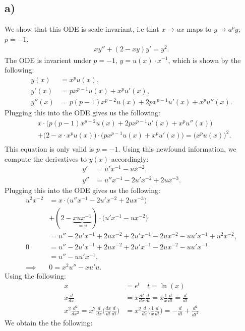 \documentclass[]{article}
\begin{document}
\subsection*{a)}
We show that this ODE is scale invariant, i.e that $x\to ax$ maps to $y\to a^{p}y$; $p = -1$.
\begin{align*}
    xy'' + (2-xy)y' = y^2.
\end{align*}
The ODE is invarient under $p =-1$, $y = u(x)\cdot x^{-1}$, which is shown by the following:
\begin{align*}
    y(x) &= x^p u(x),\\
    y'(x) &= px^{p-1}u(x) + x^p u'(x),\\ 
    y'' (x) &= p(p-1)x^{p-2}u(x) + 2px^{p-1}u'(x) + x^p u''(x).
\end{align*}Plugging this into the ODE gives us the following:
\begin{align*}
    &x\cdot\Big(p(p-1)x^{p-2}u(x) + 2px^{p-1}u'(x) + x^p u''(x)\Big)\\
    &+ \Big(2 - x\cdot x^p u(x)\Big)\cdot\Big(px^{p-1}u(x) + x^p u'(x)\Big) = \Big(x^pu(x)\Big)^2.\\
\end{align*}This equation is only valid is $p = -1$. Using this newfound information, we compute the derivatives to $y(x)$ accordingly:
\begin{align*}
    y' &= u'x^{-1} - u x^{-2},\\
    y'' &= u''x^{-1} - 2u'x^{-2} + 2u x^{-3}.
\end{align*}Plugging this into the ODE gives us the following:
\begin{align*}
    u^2 x^{-2}&= x\cdot\Big(u''x^{-1} - 2u'x^{-2} + 2u x^{-3}\Big)\\
    &+ (2-\underbrace{xux^{-1}}_{=u})\cdot\Big(u'x^{-1} - ux^{-2}\Big)\\
    &= u'' - 2u'x^{-1} + 2ux^{-2} + 2 u'x^{-1} - 2ux^{-2} -uu'x^{-1} + u^2x^{-2},\\
    0&=u'' - 2u'x^{-1} + 2ux^{-2} + 2u'x^{-1} -2u x^{-2} - u u' x^{-1}\\
    &= u'' -uu'x^{-1},\\
    \implies& 0= x^2u'' - xu' u.
\end{align*} Using the following:
\begin{align*}
    x &= e^t\quad t = \ln(x)\\
    x \frac{d}{dx} &= x \frac{dt}{dx}\frac{d}{dt} = x \frac{1}{x}\frac{d}{dt} = \frac{d}{dt}\\
    x^2 \frac{d^2}{dx^2} = x^2\frac{d}{dx}\Big(\frac{dx}{dt}\frac{d}{dt}\Big)&= x^2\frac{d}{dx}\Big(\frac{1}{x}\frac{d}{dt}\Big) = -\frac{d}{dt} + \frac{d^2}{dt^2}
\end{align*}We obtain the the following:
\end{document}

